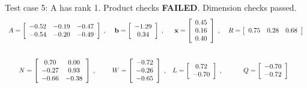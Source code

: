 {Test case 5: A has rank 1. Product checks \textbf{FAILED}. Dimension checks passed.
\[
\begin{array}{*{4}{c}}
A = \left[\begin{array}{*{3}c}
	-0.52 & -0.19 & -0.47\\
	-0.54 & -0.20 & -0.49
\end{array}\right]
\;, & 
\mathbf{b} = \left[\begin{array}{*{1}c}
	-1.29\\
	0.34
\end{array}\right]
\;, & 
\mathbf{x} = \left[\begin{array}{*{1}c}
	0.45\\
	0.16\\
	0.40
\end{array}\right]
\;, & 
R = \left[\begin{array}{*{3}c}
	0.75 & 0.28 & 0.68
\end{array}\right]
\\
\\\mbox{}\\
N = \left[\begin{array}{*{2}c}
	0.70 & 0.00\\
	-0.27 & 0.93\\
	-0.66 & -0.38
\end{array}\right]
\;, & 
W = \left[\begin{array}{*{1}c}
	-0.72\\
	-0.26\\
	-0.65
\end{array}\right]
\;, & 
L = \left[\begin{array}{*{1}c}
	0.72\\
	-0.70
\end{array}\right]
\;, & 
Q = \left[\begin{array}{*{1}c}
	-0.70\\
	-0.72
\end{array}\right]
\\
\end{array}
\]
\hrulefill

}
